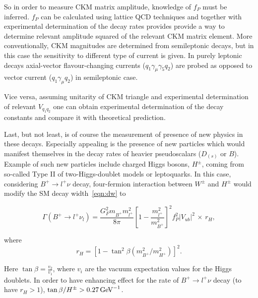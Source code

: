 So in order to measure CKM matrix amplitude, knowledge of $f_{P}$ must be inferred. $f_{P}$ can be calculated using lattice QCD techniques and together with experimental determination of the decay rates provides provide a way to determine relevant amplitude squared of the relevant CKM matrix element. More conventionally, CKM magnitudes are determined from semileptonic decays, but in this case the sensitivity to different type of current is given. In purely leptonic decays axial-vector flavour-changing currents ($q_{1}\gamma_{\mu}\gamma_{5}q_{2}$) are probed as opposed to vector current ($q_{1}\gamma_{\mu}q_{2}$) in semileptonic case.

Vice versa, assuming unitarity of CKM triangle and experimental determination of relevant $V_{q_{1}q_{2}}$ one can obtain experimental determination of the decay constants and compare it with theoretical prediction.

Last, but not least, is of course the measurement of presence of new physics in these decays. Especially appealing is the presence of new particles which would manifest themselves in the decay rates of heavier pseudoscalars ($D_{(s)}$ or $B$). Example of such new particles include charged Higgs bosons, $H^{\pm}$, coming from so-called Type II of two-Higgs-doublet models \cite{Hou:1992sy}\cite{Akeroyd:2003zr}\cite{Dobrescu:2008er} or leptoquarks\cite{Dobrescu:2008er}. In this case, considering $B^{+}\rightarrow l^{+}\nu$ decay, four-fermion interaction between $W^{\pm}$ and $H^{\pm}$ would modify the SM decay width~\autoref{eqn:dw} to

\begin{equation}
\Gamma(B^{+} \rightarrow {l^{+}} \nu_{l})=  
        \frac{G_{F}^{2} m^{}_{B^{+}}  m_{l^{+}}^{2}}{8\pi} 
        \left[1 - \frac{m_{l^{+}}^{2}}{m_{B^{+}}^{2}}\right]^{2}  
	f_{P}^{2} |V_{ub}|^{2} \,\times\, r_H,
\end{equation}

where
\begin{equation}
	r_H=[1-\tan^2\beta(m^{2}_{B^{+}}/m^{2}_{H^{+}})]^2.
\end{equation}

Here $\tan\beta = \frac{v_{2}}{v_{1}}$, where $v_{i}$ are the vacuum expectation values for the Higgs doublets. In order to have enhancing effect for the rate of $B^{+}\rightarrow l^{+}\nu$ decay (to have $r_{H}>1$), $\tan\beta/H^{\pm}> 0.27 \mathrm{\,Ge\kern -0.1em V}^{-1}$.

